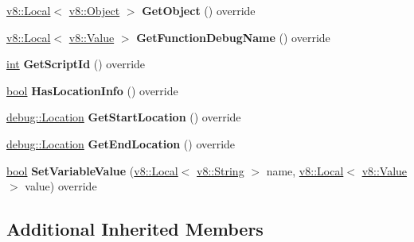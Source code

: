 \begin{DoxyCompactItemize}
\mbox{\hyperlink{classv8_1_1Local}{v8\+::\+Local}}$<$ \mbox{\hyperlink{classv8_1_1Object}{v8\+::\+Object}} $>$ {\bfseries Get\+Object} () override
\item 
\mbox{\label{classv8_1_1internal_1_1DebugScopeIterator_a8a231fcdedba3cf0a9042e169aa47e14}} 
\mbox{\hyperlink{classv8_1_1Local}{v8\+::\+Local}}$<$ \mbox{\hyperlink{classv8_1_1Value}{v8\+::\+Value}} $>$ {\bfseries Get\+Function\+Debug\+Name} () override
\item 
\mbox{\label{classv8_1_1internal_1_1DebugScopeIterator_ae341a426f9593b99cf1218e5ef82e601}} 
\mbox{\hyperlink{classint}{int}} {\bfseries Get\+Script\+Id} () override
\item 
\mbox{\label{classv8_1_1internal_1_1DebugScopeIterator_ae7cbf3a1791d37936c34f9f6f7807239}} 
\mbox{\hyperlink{classbool}{bool}} {\bfseries Has\+Location\+Info} () override
\item 
\mbox{\label{classv8_1_1internal_1_1DebugScopeIterator_a006684a052633ca4740c4cd2011b8623}} 
\mbox{\hyperlink{classv8_1_1debug_1_1Location}{debug\+::\+Location}} {\bfseries Get\+Start\+Location} () override
\item 
\mbox{\label{classv8_1_1internal_1_1DebugScopeIterator_a786c73665e8887290b583420625c53cc}} 
\mbox{\hyperlink{classv8_1_1debug_1_1Location}{debug\+::\+Location}} {\bfseries Get\+End\+Location} () override
\item 
\mbox{\label{classv8_1_1internal_1_1DebugScopeIterator_a8014c88a31fd3b6284ab00361d513a16}} 
\mbox{\hyperlink{classbool}{bool}} {\bfseries Set\+Variable\+Value} (\mbox{\hyperlink{classv8_1_1Local}{v8\+::\+Local}}$<$ \mbox{\hyperlink{classv8_1_1String}{v8\+::\+String}} $>$ name, \mbox{\hyperlink{classv8_1_1Local}{v8\+::\+Local}}$<$ \mbox{\hyperlink{classv8_1_1Value}{v8\+::\+Value}} $>$ value) override
\end{DoxyCompactItemize}
\subsection*{Additional Inherited Members}



